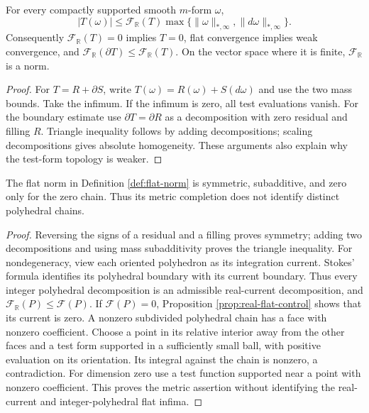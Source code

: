 \begin{proposition}\label{prop:real-flat-control}
For every compactly supported smooth $m$-form $\omega$,
\[
 |T(\omega)|\leq\mathcal F_{\mathbb R}(T)
 \max\{\|\omega\|_{*,\infty},\|d\omega\|_{*,\infty}\}.
\]
Consequently $\mathcal F_{\mathbb R}(T)=0$ implies $T=0$, flat convergence implies weak convergence, and
$\mathcal F_{\mathbb R}(\partial T)\leq\mathcal F_{\mathbb R}(T)$.
On the vector space where it is finite, $\mathcal F_{\mathbb R}$ is a norm.
\end{proposition}
\begin{proof}
For $T=R+\partial S$, write $T(\omega)=R(\omega)+S(d\omega)$ and use the two mass bounds. Take the infimum. If the infimum is zero, all test evaluations vanish. For the boundary estimate use $\partial T=\partial R$ as a decomposition with zero residual and filling $R$. Triangle inequality follows by adding decompositions; scaling decompositions gives absolute homogeneity. These arguments also explain why the test-form topology is weaker.
\end{proof}

\begin{proposition}\label{prop:polyhedral-flat-nondegeneracy}
The flat norm in Definition \ref{def:flat-norm} is symmetric, subadditive, and zero only for the zero chain. Thus its metric completion does not identify distinct polyhedral chains.
\end{proposition}
\begin{proof}
Reversing the signs of a residual and a filling proves symmetry; adding two decompositions and using mass subadditivity proves the triangle inequality. For nondegeneracy, view each oriented polyhedron as its integration current. Stokes' formula identifies its polyhedral boundary with its current boundary. Thus every integer polyhedral decomposition is an admissible real-current decomposition, and
$\mathcal F_{\mathbb R}(P)\leq\mathcal F(P)$.
If $\mathcal F(P)=0$, Proposition \ref{prop:real-flat-control} shows that its current is zero. A nonzero subdivided polyhedral chain has a face with nonzero coefficient. Choose a point in its relative interior away from the other faces and a test form supported in a sufficiently small ball, with positive evaluation on its orientation. Its integral against the chain is nonzero, a contradiction. For dimension zero use a test function supported near a point with nonzero coefficient. This proves the metric assertion without identifying the real-current and integer-polyhedral flat infima.
\end{proof}

